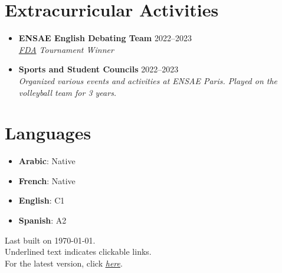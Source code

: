 \documentclass[letterpaper,11pt,twocolumn]{article}
\newcommand{\resumeSubheading}[4]{
	\vspace{-2pt}\item \textbf{#1} \hfill #2 \\
	\textit{\small #3} \hfill \textit{\small #4} 
	\vspace{-7pt}
}
\begin{document}
\section{Extracurricular Activities}
\begin{itemize}[leftmargin=*]
	\resumeSubheading
	{ENSAE English Debating Team}{2022--2023}{\href{https://www.frenchdebatingassociation.fr/#fda}{FDA} Tournament Winner}{}
	\resumeSubheading
	{Sports and Student Councils}{2022--2023}{Organized various events and activities at ENSAE Paris. Played on the volleyball team for 3 years.}{}
\end{itemize}

\section{Languages}
\begin{itemize}[leftmargin=*]
	\item \textbf{Arabic}: Native
	\item \textbf{French}: Native
	\item \textbf{English}: C1
	\item \textbf{Spanish}: A2
\end{itemize}

\begin{flushright}
	\vspace{-4pt}
	\color{gray}
	Last built on \today.  \\
	Underlined text indicates clickable links. \\
	For the latest version, click \href{https://machtayassine.github.io/resume/resume_ymachta.pdf}{\underline{\textit{here}}}.
\end{flushright}
\end{document}
